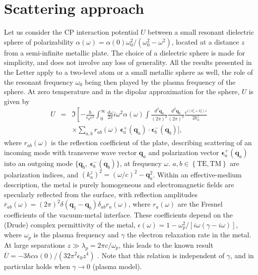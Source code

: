 \documentclass[doublecol]{epl2}
\newcommand{\bs}[1]{{\boldsymbol{#1}}}
\newcommand{\bq}{\bs{q}}
\newcommand{\be}{\bs{\epsilon}}
\begin{document}
\section{Scattering approach}

Let us consider the CP interaction potential $U$ between a small resonant dielectric sphere of polarizability $\alpha(\omega)=\alpha(0)\omega_0^2/(\omega_0^2-\omega^2)$, located at a distance $z$ from a semi-infinite metallic plate. The choice of a dielectric sphere is made for simplicity, and does not involve any loss of generality. All the results presented in the Letter apply to a two-level atom or a small metallic sphere as well, the role of the resonant frequency $\omega_0$ being then played by the plasma frequency of the sphere.
At zero temperature and in the dipolar approximation for the sphere, $U$ is given by \cite{Emig07, Messina09}
\begin{eqnarray}
U&=&\Im
\left[-\frac{\hbar}{\epsilon_0 c^2}\int_0^\infty\frac{d\omega}{2\pi}i\omega^2\alpha(\omega)
\int\frac{d^2\bq_a}{(2\pi)^2}
\frac{d^2\bq_b}{(2\pi)^2}
\frac{e^{i (k_a^z+k_b^z)z}}{2 k_a^z}
\right.\nonumber\\
&&\times \sum_{a,b}r_{ab}(\omega)
\, \be_a^+(\bq_a)\cdot\be_b^-(\bq_b)\bigg],
\label{EqU}
\end{eqnarray}
where $r_{ab}(\omega)$ is the reflection coefficient of the plate, describing scattering of an incoming mode with transverse wave vector $\bq_a$ and polarization vector $\be_a^+(\bq_a)$ into an outgoing mode $\{\bq_b,\ \be_b^-(\bq_b)\}$, at frequency $\omega$. $a,b\in\left\{\text{TE},\text{TM}\right\}$ are polarization indices, and $(k^z_a)^2=(\omega/c)^2-\bq_a^2$. 
Within an effective-medium description, the metal is purely homogeneous and electromagnetic fields are specularly reflected from the surface, with reflection amplitudes $\overline{r}_{ab}(\omega)=(2\pi)^2\delta(\bq_1-\bq_b)\delta_{ab} r_a(\omega)$, where $r_a(\omega)$ are the Fresnel coefficients of the vacuum-metal interface. These coefficients depend on the (Drude) complex permittivity of the metal, $\epsilon(\omega)=1-\omega_p^2/[i\omega(\gamma-i\omega)]$, where $\omega_p$ is the plasma frequency and $\gamma$ the electron relaxation rate in the metal. At large separations $z\gg\lambda_p=2\pi c/\omega_p$, this leads to the known result $\overline{U}=-3\hbar c \alpha(0)/(32\pi^2\epsilon_0z^4)$ \cite{Messina09}.
Note that this relation is independent of $\gamma$, and in particular holds when $\gamma\to0$ (plasma model).
\end{document}
